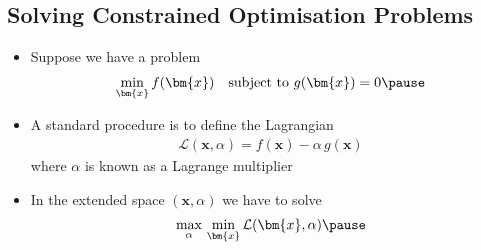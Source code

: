 
\begin{slide}
\section[-1]{Solving Constrained Optimisation Problems}

\begin{PauseHighLight}
  \begin{itemize}
  \item Suppose we have a problem
    \begin{align*}
      \min_{\bm{x}} f(\bm{x}) \quad \mbox{subject to $g(\bm{x})=0$}\pause
    \end{align*}
  \item A standard procedure is to define the Lagrangian
    \begin{align*}
      \mathcal{L}(\bm{x},\alpha) = f(\bm{x}) - \alpha\, g(\bm{x})
    \end{align*}
    where $\alpha$ is known as a Lagrange multiplier\pause
  \item In the extended space $(\bm{x},\alpha)$ we have to solve
    \begin{align*}
      \max_{\alpha} \, \min_{\bm{x}} \mathcal{L}(\bm{x},\alpha)\pause
    \end{align*}
  \end{itemize}
\end{PauseHighLight}

\end{slide}


